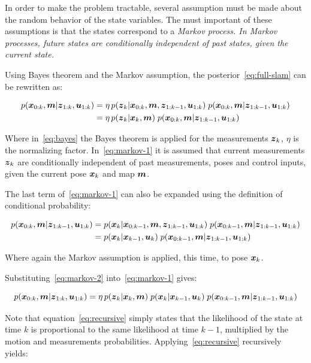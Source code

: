 In order to make the problem tractable, several assumption must be made about the random behavior of the state variables. The must important of these assumptions is that the states correspond to a \it{Markov process}. In Markov processes, future states are conditionally independent of past states, given the current state.

Using Bayes theorem and the Markov assumption, the posterior~\eqref{eq:full-slam} can be rewritten as:

\begin{align}
p(\boldsymbol{x}_{0:k},\boldsymbol{m}|\boldsymbol{z}_{1:k},\boldsymbol{u}_{1:k}) &= 
\eta\,p(\boldsymbol{z}_{k}|\boldsymbol{x}_{0:k},\boldsymbol{m},\boldsymbol{z}_{1:k-1},\boldsymbol{u}_{1:k})\; p(\boldsymbol{x}_{0:k},\boldsymbol{m}|\boldsymbol{z}_{1:k-1},\boldsymbol{u}_{1:k})
\label{eq:bayes}\\
&= \eta\,p(\boldsymbol{z}_{k}|\boldsymbol{x}_{k},\boldsymbol{m})\; p(\boldsymbol{x}_{0:k},\boldsymbol{m}|\boldsymbol{z}_{1:k-1},\boldsymbol{u}_{1:k})\label{eq:markov-1}
\end{align}

Where in~\eqref{eq:bayes} the Bayes theorem is applied for the measurements $\boldsymbol{z}_k$, $\eta$ is the normalizing factor. In~\eqref{eq:markov-1} it is assumed that current measurements $\boldsymbol{z}_k$ are conditionally independent of past measurements, poses and control inputs, given the current pose $\boldsymbol{x}_k$ and map $\boldsymbol{m}$.

The last term of~\eqref{eq:markov-1} can also be expanded using the definition of conditional probability:

\begin{align}
p(\boldsymbol{x}_{0:k},\boldsymbol{m}|\boldsymbol{z}_{1:k-1},\boldsymbol{u}_{1:k}) &=
p(\boldsymbol{x}_{k}|\boldsymbol{x}_{0:k-1},\boldsymbol{m},\boldsymbol{z}_{1:k-1},\boldsymbol{u}_{1:k})\; p(\boldsymbol{x}_{0:k-1},\boldsymbol{m}|\boldsymbol{z}_{1:k-1},\boldsymbol{u}_{1:k})\\
&= p(\boldsymbol{x}_{k}|\boldsymbol{x}_{k-1},\boldsymbol{u}_{k})\; p(\boldsymbol{x}_{0:k-1},\boldsymbol{m}|\boldsymbol{z}_{1:k-1},\boldsymbol{u}_{1:k}) \label{eq:markov-2}
\end{align}

Where again the Markov assumption is applied, this time, to pose $\boldsymbol{x}_k$. 

Substituting~\eqref{eq:markov-2} into~\eqref{eq:markov-1} gives:

\begin{equation}
p(\boldsymbol{x}_{0:k},\boldsymbol{m}|\boldsymbol{z}_{1:k},\boldsymbol{u}_{1:k}) = 
\eta\,p(\boldsymbol{z}_{k}|\boldsymbol{x}_{k},\boldsymbol{m})\;
p(\boldsymbol{x}_{k}|\boldsymbol{x}_{k-1},\boldsymbol{u}_{k})\; p(\boldsymbol{x}_{0:k-1},\boldsymbol{m}|\boldsymbol{z}_{1:k-1},\boldsymbol{u}_{1:k})
\label{eq:recursive}
\end{equation}

Note that equation~\eqref{eq:recursive} simply states that the likelihood of the state at time $k$ is proportional to the same likelihood at time $k-1$, multiplied by the motion and measurements probabilities. Applying~\eqref{eq:recursive} recursively yields:
  
